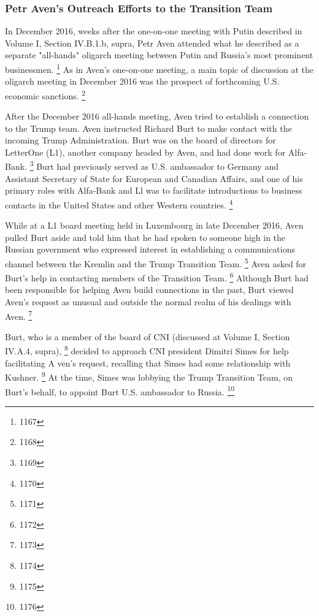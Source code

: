 \subsubsection{Petr Aven's Outreach Efforts to the Transition Team}

In December 2016, weeks after the one-on-one meeting with Putin described in Volume I, Section IV.B.1.b, supra, Petr Aven attended what he described as a separate "all-hands" oligarch meeting between Putin and Russia's most prominent businessmen.%
\footnote{1167}
As in Aven's one-on-one meeting, a main topic of discussion at the oligarch meeting in December 2016 was the prospect of forthcoming U.S. economic sanctions.%
\footnote{1168}

After the December 2016 all-hands meeting, Aven tried to establish a connection to the Trump team.
Aven instructed Richard Burt to make contact with the incoming Trump Administration.
Burt was on the board of directors for LetterOne (L1), another company headed by Aven, and had done work for Alfa-Bank.%
\footnote{1169}
Burt had previously served as U.S. ambassador to Germany and Assistant Secretary of State for European and Canadian Affairs, and one of his primary roles with Alfa-Bank and Ll was to facilitate introductions to business contacts in the United States and other Western countries.%
\footnote{1170}

While at a L1 board meeting held in Luxembourg in late December 2016, Aven pulled Burt aside and told him that he had spoken to someone high in the Russian government who expressed interest in establishing a communications channel between the Kremlin and the Trump Transition Team.%
\footnote{1171}
Aven asked for Burt's help in contacting members of the Transition Team.%
\footnote{1172}
Although Burt had been responsible for helping Aven build connections in the past, Burt viewed Aven's request as unusual and outside the normal realm of his dealings with Aven.%
\footnote{1173}

Burt, who is a member of the board of CNI (discussed at Volume I, Section IV.A.4, supra),%
\footnote{1174}
decided to approach CNI president Dimitri Simes for help facilitating A ven's request, recalling that Simes had some relationship with Kushner.%
\footnote{1175}
At the time, Simes was lobbying the Trump Transition Team, on Burt's behalf, to appoint Burt U.S. ambassador to Russia.%
\footnote{1176}

